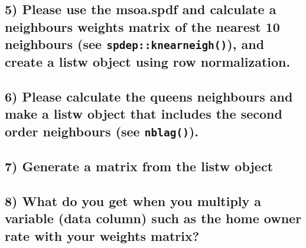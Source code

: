 \documentclass[
  letterpaper,
  DIV=11,
  numbers=noendperiod]{scrreprt}
\begin{document}
\hypertarget{please-use-the-msoa.spdf-and-calculate-a-neighbours-weights-matrix-of-the-nearest-10-neighbours-see-spdepknearneigh-and-create-a-listw-object-using-row-normalization.-1}{%
\subsection*{\texorpdfstring{5) Please use the msoa.spdf and calculate a
neighbours weights matrix of the nearest 10 neighbours (see
\texttt{spdep::knearneigh()}), and create a listw object using row
normalization.}{5) Please use the msoa.spdf and calculate a neighbours weights matrix of the nearest 10 neighbours (see spdep::knearneigh()), and create a listw object using row normalization.}}\label{please-use-the-msoa.spdf-and-calculate-a-neighbours-weights-matrix-of-the-nearest-10-neighbours-see-spdepknearneigh-and-create-a-listw-object-using-row-normalization.-1}}

\hypertarget{please-calculate-the-queens-neighbours-and-make-a-listw-object-that-includes-the-second-order-neighbours-see-nblag.}{%
\subsection*{\texorpdfstring{6) Please calculate the queens neighbours
and make a listw object that includes the second order neighbours (see
\texttt{nblag()}).}{6) Please calculate the queens neighbours and make a listw object that includes the second order neighbours (see nblag()).}}\label{please-calculate-the-queens-neighbours-and-make-a-listw-object-that-includes-the-second-order-neighbours-see-nblag.}}

\hypertarget{generate-a-matrix-from-the-listw-object}{%
\subsection*{7) Generate a matrix from the listw
object}\label{generate-a-matrix-from-the-listw-object}}

\hypertarget{what-do-you-get-when-you-multiply-a-variable-data-column-such-as-the-home-owner-rate-with-your-weights-matrix}{%
\subsection*{8) What do you get when you multiply a variable (data
column) such as the home owner rate with your weights
matrix?}\label{what-do-you-get-when-you-multiply-a-variable-data-column-such-as-the-home-owner-rate-with-your-weights-matrix}}
\end{document}
